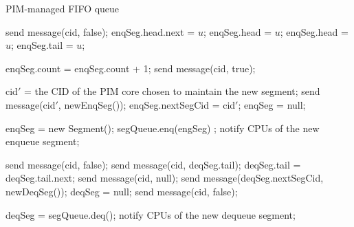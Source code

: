 \begin{algorithm*}[ht!]
{\footnotesize
\caption{PIM-managed FIFO queue}
\label{alg:queue}
\vspace{-2.5ex}
\begin{multicols}{2}
\begin{algorithmic}[1]
        \State send message(cid, false);
    \Else
            \State enqSeg.head.next = $u$;
            \State enqSeg.head = $u$;
        \Else
            \State enqSeg.head = $u$;
            \State enqSeg.tail = $u$;
        \EndIf

        \State enqSeg.count = enqSeg.count + 1;
        \State send message(cid, true);

            \State cid$'$ = the CID of the PIM core chosen to maintain the new segment;
            \State send message(cid$'$, newEnqSeg());
            \State enqSeg.nextSegCid = cid$'$;
            \State enqSeg = null;
        \EndIf
    \EndIf
\item[]
\EndProcedure
\end{algorithmic}

\begin{algorithmic}[1]
	\State enqSeg = new Segment();
	\State segQueue.enq(engSeg) ;
	\State notify CPUs of the new enqueue segment;
\EndProcedure
\end{algorithmic}

\columnbreak

\begin{algorithmic}[1]
        \State send message(cid, false);
    \Else
			\State send message(cid, deqSeg.tail);
            \State deqSeg.tail = deqSeg.tail.next;   
        \Else
				\State send message(cid, null);
			\Else
                \State send message(deqSeg.nextSegCid, newDeqSeg());
                \State deqSeg = null;
                \State send message(cid, false);
            \EndIf            
        \EndIf 
    \EndIf     
\item[]
\EndProcedure
\end{algorithmic}


\begin{algorithmic}[1]
	\State deqSeg = segQueue.deq();
	\State notify CPUs of the new dequeue segment; 
\EndProcedure
\end{algorithmic}

\end{multicols}
}
\vspace{-2ex}
\end{algorithm*}


